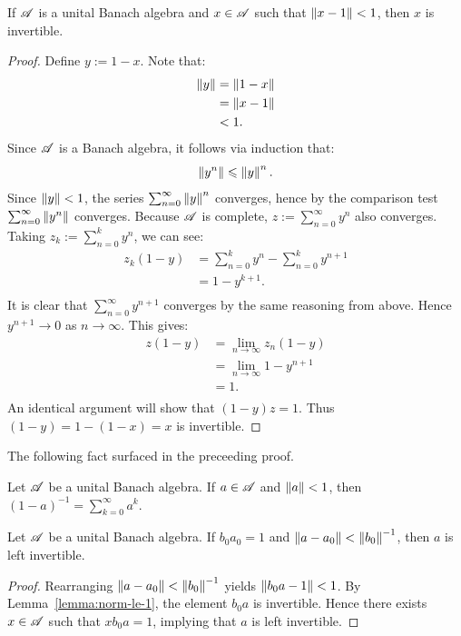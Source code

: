 \documentclass[reqno]{amsart}
\begin{document}
\begin{lemma}\label{lemma:norm-le-1}
	If $\mathscr{A}$ is a unital Banach algebra and $x \in \mathscr{A}$ such that $\left\lVert x-1 \right\rVert < 1$, then $x$ is invertible.
\end{lemma}
	\begin{proof}
		Define $y:=1-x$. Note that:
		\begin{align*}
			\left\lVert y \right\rVert
			&= \left\lVert 1-x \right\rVert \\
			&= \left\lVert x-1 \right\rVert \\
			&< 1.
		\end{align*}
		Since $\mathscr{A}$ is a Banach algebra, it follows via induction that:
		\[
			\left\lVert y^n \right\rVert \leqslant \left\lVert y \right\rVert^n.
		\]
		Since $\left\lVert y \right\rVert < 1$, the series $\sum_{n=0}^{\infty} \left\lVert y \right\rVert^n$ converges, hence by the comparison test $\sum_{n=0}^{\infty} \left\lVert y^n \right\rVert$ converges. Because $\mathscr{A}$ is complete, $z:=\sum_{n=0}^{\infty}y^n$ also converges. Taking $z_k := \sum_{n=0}^{k}y^n$, we can see:
		\begin{align*}
			z_k(1-y)
			&= \sum_{n=0}^{k} y^n - \sum_{n=0}^{k} y^{n+1} \\
			&= 1-y^{k+1}. \\
		\end{align*}
		It is clear that $\sum_{n=0}^{\infty} y^{n+1}$ converges by the same reasoning from above. Hence $y^{n+1} \rightarrow 0$ as $n \rightarrow \infty$. This gives:
		\begin{align*}
			z(1-y)
			&= \lim_{n \rightarrow \infty}z_n(1-y) \\
			&= \lim_{n \rightarrow \infty}1-y^{n+1} \\
			&= 1. \\
		\end{align*}
		An identical argument will show that $(1-y)z = 1$. Thus $(1-y) = 1-(1-x) = x$ is invertible.
	\end{proof}

The following fact surfaced in the preceeding proof.

\begin{corollary}\label{cor:power-series-basic}
	Let $\mathscr{A}$ be a unital Banach algebra. If $a \in \mathscr{A}$ and $\left\lVert a \right\rVert < 1$, then $(1-a)^{-1} = \sum_{k=0}^{\infty} a^k$.
\end{corollary}

\begin{lemma}\label{lemma:inverse-pertubation}
	Let $\mathscr{A}$ be a unital Banach algebra. If $b_0 a_0 = 1$ and $\left\lVert a - a_0 \right\rVert < \left\lVert b_0 \right\rVert^{-1}$, then $a$ is left invertible. 
\end{lemma}	
	\begin{proof}
		Rearranging $\left\lVert a-a_0 \right\rVert < \left\lVert b_0 \right\rVert^{-1}$ yields $\left\lVert b_0 a - 1 \right\rVert < 1$. By Lemma~\ref{lemma:norm-le-1}, the element $b_0a$ is invertible. Hence there exists $x \in \mathscr{A}$ such that $xb_0a = 1$, implying that $a$ is left invertible.
	\end{proof}
\end{document}
